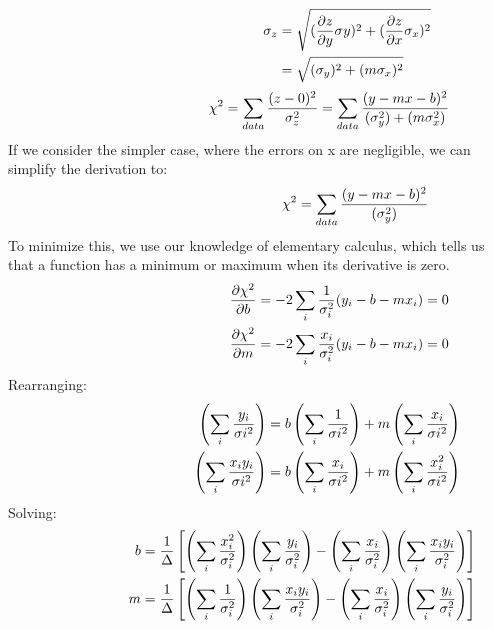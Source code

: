 \begin{align*} \hspace{44 mm}
\sigma_{z}&=\sqrt{(\frac{\partial z }{\partial y} \sigma_{}y)^{2}+(\frac{\partial z}{\partial x}\sigma_{x})^{2}}\\
\hspace{9mm}&=\sqrt{(\sigma_{y})^{2}+(m\sigma_{x})^{2}}
\end{align*}
\begin{equation*}\hspace{35mm}
\chi^{2}=\sum_{data}\frac{(z-0)^{2}}{\sigma_{z}^{2}}=\sum_{data}\frac{(y-mx-b)^{2}}{(\sigma_{y}^{2})+(m\sigma_{x}^{2})}
\end{equation*}
\noindent
If we consider the simpler case, where the errors on x are negligible, we can simplify the derivation to: 
\begin{equation*}\hspace{48mm}
\chi^{2}=\sum_{data}\frac{(y-mx-b)^{2}}{(\sigma_{y}^{2})}
\end{equation*}
To minimize this, we use our knowledge of elementary calculus, which tells us that a function has a minimum or maximum when its derivative is zero.
\begin{align*}\hspace{40mm}
\frac{\partial\chi^2  }{\partial b}=-2\sum_{i}\frac{1}{\sigma_{i}^{2}}(y_{i}-b-mx_{i})=0\\
\frac{\partial\chi^2  }{\partial m}=-2\sum_{i}\frac{x_{i}}{\sigma_{i}^{2}}(y_{i}-b-mx_{i})=0
\end{align*}
Rearranging: 
\begin{align*}\hspace{35mm}
\left(\sum_{i}\frac{y_{i}}{\sigma{i}^{2}}\right)=b\left(\sum_{i}\frac{{1}}{\sigma{i}^{2}}\right)+m\left(\sum_{i}\frac{x_{i}}{\sigma{i}^{2}}\right)\\
\left(\sum_{i}\frac{x_{i}y_{i}}{\sigma{i}^{2}}\right)=b\left(\sum_{i}\frac{{x_{i}}}{\sigma{i}^{2}}\right)+m\left(\sum_{i}\frac{x_{i}^{2}}{\sigma{i}^{2}}\right)
\end{align*}
Solving: 
\begin{align*}\hspace{23mm}
b=\frac{1}{\Delta}\left[ \left(\sum_{i}\frac{x_{i}^{2}}{\sigma_{i}^{2}} \right ) \left(\sum_{i}\frac{y_{i}}{\sigma_{i}^{2}} \right)-\left( \sum_{i}\frac{x_{i}}{\sigma_{i}^{2}}\right)\left(\sum_{i}\frac{x_{i}y_{i}}{\sigma_{i}^{2}}\right )\right]\\
m=\frac{1}{\Delta}\left[ \left(\sum_{i}\frac{1}{\sigma_{i}^{2}} \right ) \left(\sum_{i}\frac{x_{i}y_{i}}{\sigma_{i}^{2}} \right)-\left( \sum_{i}\frac{x_{i}}{\sigma_{i}^{2}}\right)\left(\sum_{i}\frac{y_{i}}{\sigma_{i}^{2}}\right )\right]
\end{align*}
